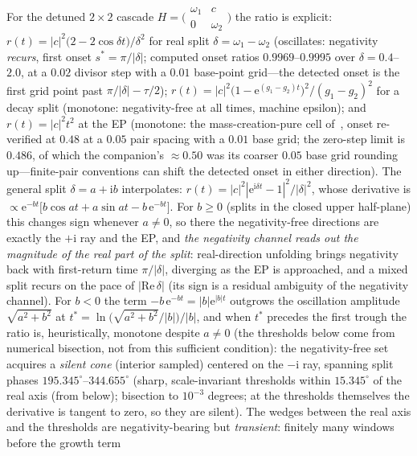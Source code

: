 ﻿\documentclass[11pt]{article}
\newcommand{\ee}{\mathrm{e}}
\newcommand{\ii}{\mathrm{i}}
\theoremstyle{remark}
\begin{document}
For the detuned $2\times2$ cascade
$H=\bigl(\begin{smallmatrix}\omega_1&c\\0&\omega_2
\end{smallmatrix}\bigr)$ the ratio is explicit:
$r(t)=|c|^2\bigl(2-2\cos\delta t\bigr)/\delta^2$ for real split
$\delta=\omega_1-\omega_2$ (oscillates: negativity \emph{recurs},
first onset $s^*=\pi/|\delta|$; computed onset ratios
$0.9969$--$0.9995$ over $\delta=0.4$--$2.0$, at a $0.02$ divisor
step with a $0.01$ base-point grid---the detected onset is the
first grid point past $\pi/|\delta|-\tau/2$);
$r(t)=|c|^2\bigl(1-\ee^{(g_1-g_2)t}\bigr)^2/(g_1-g_2)^2$ for a
decay split (monotone: negativity-free at all times, machine
epsilon); and $r(t)=|c|^2t^2$ at the EP (monotone: the
mass-creation-pure cell of~\cite{choosing}, onset re-verified at
$0.48$ at a $0.05$ pair spacing with a $0.01$ base grid; the
zero-step limit is $0.486$, of which the companion's $\approx0.50$
was its coarser $0.05$ base grid rounding up---finite-pair
conventions can shift the detected onset in either direction). The general split $\delta=a+\ii b$ interpolates:
$r(t)=|c|^2|\ee^{\ii\delta t}-1|^2/|\delta|^2$, whose derivative
is $\propto\ee^{-bt}\bigl[b\cos at+a\sin at-b\,\ee^{-bt}\bigr]$.
For $b\ge0$ (splits in the closed upper half-plane) this changes
sign whenever $a\neq0$, so there the negativity-free directions
are exactly the $+\ii$ ray and the EP, and \emph{the negativity
channel reads out the magnitude of the real part of the split}:
real-direction unfolding brings
negativity back with first-return time $\pi/|\delta|$, diverging as
the EP is approached, and a mixed split recurs on the pace of
$|\mathrm{Re}\,\delta|$ (its sign is a residual ambiguity of the
negativity channel). For $b<0$ the term $-b\,\ee^{-bt}
=|b|\ee^{|b|t}$ outgrows the oscillation amplitude
$\sqrt{a^2+b^2}$ at $t^*=\ln\bigl(\sqrt{a^2+b^2}/|b|\bigr)/|b|$,
and when $t^*$ precedes the first trough the ratio is, heuristically,
monotone despite $a\neq0$ (the thresholds below come from numerical
bisection, not from this sufficient condition): the negativity-free set acquires a
\emph{silent cone} (interior sampled) centered on the $-\ii$ ray, spanning split
phases $195.345^\circ$--$344.655^\circ$ (sharp, scale-invariant
thresholds within $15.345^\circ$ of the real axis (from below); bisection
to $10^{-3}$ degrees; at the thresholds themselves the derivative
is tangent to zero, so they are silent). The wedges between the
real axis and the thresholds are negativity-bearing but
\emph{transient}: finitely many windows before the growth term
\end{document}
